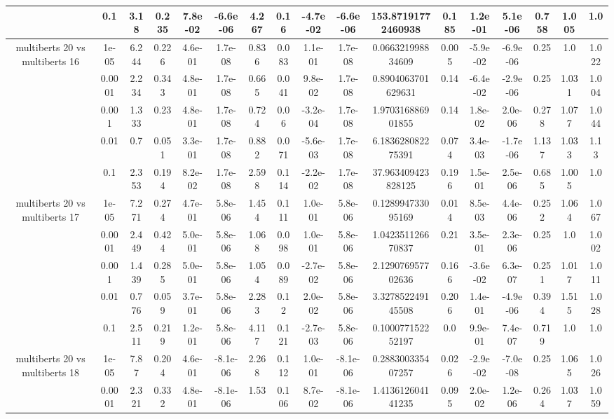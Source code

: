 \begin{tabular}{|c|c|c|c|c|c|c|c|c|c|c|c|c|c|c|c|c|}
 & 0.1 & 3.18 & 0.235 & 7.8e-02 & -6.6e-06 & 4.267 & 0.16 & -4.7e-02 & -6.6e-06 & 153.87191772460938 & 0.185 & 1.2e-01 & 5.1e-06 & 0.758 & 1.005 & 1.0 \\
\hline
\multirow{5}{*}{multiberts 20 vs multiberts 16} & 1e-05 & 6.244 & 0.226 & 4.6e-01 & 1.7e-08 & 0.836 & 0.083 & 1.1e-01 & 1.7e-08 & 0.066321998834609 & 0.005 & -5.9e-02 & -6.9e-06 & 0.25 & 1.0 & 1.022 \\
 & 0.0001 & 2.234 & 0.343 & 4.8e-01 & 1.7e-08 & 0.665 & 0.041 & 9.8e-02 & 1.7e-08 & 0.8904063701629631 & 0.14 & -6.4e-02 & -2.9e-06 & 0.25 & 1.031 & 1.004 \\
 & 0.001 & 1.333 & 0.23 & 4.8e-01 & 1.7e-08 & 0.724 & 0.06 & -3.2e-04 & 1.7e-08 & 1.970316886901855 & 0.14 & 1.8e-02 & 2.0e-06 & 0.278 & 1.077 & 1.044 \\
 & 0.01 & 0.7 & 0.051 & 3.3e-01 & 1.7e-08 & 0.882 & 0.071 & -5.6e-03 & 1.7e-08 & 6.183628082275391 & 0.074 & 3.4e-03 & -1.7e-06 & 1.137 & 1.033 & 1.13 \\
 & 0.1 & 2.353 & 0.194 & 8.2e-02 & 1.7e-08 & 2.598 & 0.114 & -2.2e-02 & 1.7e-08 & 37.963409423828125 & 0.196 & 1.5e-01 & 2.5e-06 & 0.685 & 1.005 & 1.0 \\
\hline
\multirow{5}{*}{multiberts 20 vs multiberts 17} & 1e-05 & 7.271 & 0.274 & 4.7e-01 & 5.8e-06 & 1.454 & 0.111 & 1.0e-01 & 5.8e-06 & 0.128994733095169 & 0.014 & 8.5e-03 & 4.4e-06 & 0.252 & 1.064 & 1.067 \\
 & 0.0001 & 2.449 & 0.424 & 5.0e-01 & 5.8e-06 & 1.068 & 0.098 & 1.0e-01 & 5.8e-06 & 1.042351126670837 & 0.21 & 3.5e-01 & 2.3e-06 & 0.25 & 1.0 & 1.002 \\
 & 0.001 & 1.439 & 0.285 & 5.0e-01 & 5.8e-06 & 1.054 & 0.089 & -2.7e-02 & 5.8e-06 & 2.129076957702636 & 0.166 & -3.6e-02 & 6.3e-07 & 0.251 & 1.017 & 1.011 \\
 & 0.01 & 0.776 & 0.059 & 3.7e-01 & 5.8e-06 & 2.283 & 0.12 & 2.0e-02 & 5.8e-06 & 3.327852249145508 & 0.206 & 1.4e-01 & -4.9e-06 & 0.394 & 1.515 & 1.028 \\
 & 0.1 & 2.511 & 0.219 & 1.2e-01 & 5.8e-06 & 4.117 & 0.121 & -2.7e-03 & 5.8e-06 & 0.100077152252197 & 0.0 & 9.9e-01 & 7.4e-07 & 0.719 & 1.0 & 1.0 \\
\hline
\multirow{5}{*}{multiberts 20 vs multiberts 18} & 1e-05 & 7.87 & 0.204 & 4.6e-01 & -8.1e-06 & 2.268 & 0.112 & 1.0e-01 & -8.1e-06 & 0.288300335407257 & 0.026 & -2.9e-02 & -7.0e-08 & 0.25 & 1.065 & 1.026 \\
 & 0.0001 & 2.321 & 0.332 & 4.8e-01 & -8.1e-06 & 1.53 & 0.106 & 8.7e-02 & -8.1e-06 & 1.413612604141235 & 0.095 & 2.0e-02 & 1.2e-06 & 0.264 & 1.037 & 1.059 \\

\end{tabular}
